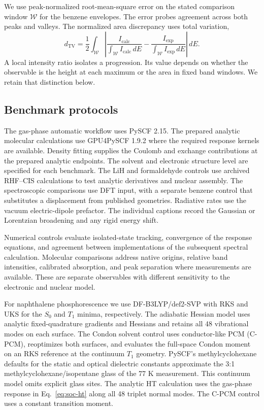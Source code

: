 \documentclass[11pt]{article}
\begin{document}
We use peak-normalized root-mean-square error on the stated comparison window $\mathcal W$ for the benzene envelopes. The error probes agreement across both peaks and valleys. The normalized area discrepancy uses total variation,
\begin{equation}
 d_{\mathrm{TV}}=\frac{1}{2}\int_{\mathcal W}
 \left|\frac{I_{\mathrm{calc}}}{\int_{\mathcal W} I_{\mathrm{calc}}\,dE}
       -\frac{I_{\mathrm{exp}}}{\int_{\mathcal W} I_{\mathrm{exp}}\,dE}\right|\,dE .
 \label{eq:tv}
\end{equation}
A local intensity ratio isolates a progression. Its value depends on whether the observable is the height at each maximum or the area in fixed band windows. We retain that distinction below.


\subsection{Benchmark protocols}

The gas-phase automatic workflow uses PySCF 2.15. The prepared analytic molecular calculations use GPU4PySCF 1.9.2 where the required response kernels are available. Density fitting supplies the Coulomb and exchange contributions at the prepared analytic endpoints. The solvent and electronic structure level are specified for each benchmark. The LiH and formaldehyde controls use archived RHF--CIS calculations to test analytic derivatives and nuclear assembly. The spectroscopic comparisons use DFT input, with a separate benzene control that substitutes a displacement from published geometries. Radiative rates use the vacuum electric-dipole prefactor. The individual captions record the Gaussian or Lorentzian broadening and any rigid energy shift.

Numerical controls evaluate isolated-state tracking, convergence of the response equations, and agreement between implementations of the subsequent spectral calculation. Molecular comparisons address native origins, relative band intensities, calibrated absorption, and peak separation where measurements are available. These are separate observables with different sensitivity to the electronic and nuclear model.

For naphthalene phosphorescence we use DF-B3LYP/def2-SVP with RKS and UKS for the $S_0$ and $T_1$ minima, respectively. The adiabatic Hessian model uses analytic fixed-quadrature gradients and Hessians and retains all 48 vibrational modes on each surface. The Condon solvent control uses conductor-like PCM (C-PCM), reoptimizes both surfaces, and evaluates the full-space Condon moment on an RKS reference at the continuum $T_1$ geometry. PySCF's methylcyclohexane defaults for the static and optical dielectric constants approximate the 3:1 methylcyclohexane/isopentane glass of the 77 K measurement.\cite{velardo} This continuum model omits explicit glass sites. The analytic HT calculation uses the gas-phase response in Eq.~\eqref{eq:soc-ht} along all 48 triplet normal modes. The C-PCM control uses a constant transition moment.
\end{document}
